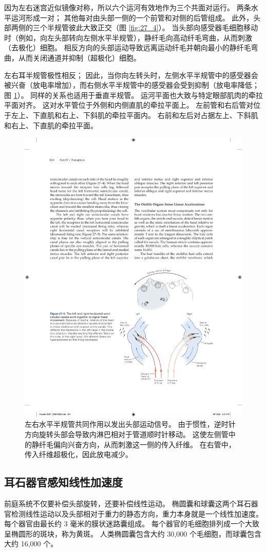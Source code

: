 因为左右迷宫近似镜像对称，所以六个运河有效地作为三个共面对运行。
两条水平运河形成一对； 其他每对由头部一侧的一个前管和对侧的后管组成。
此外，头部两侧的三个半规管彼此大致正交（图 \ref{fig:27_4}）。
当头部向感受器毛细胞移动时（例如，向左头部转向左侧水平半规管），静纤毛向高动纤毛弯曲，从而刺激（去极化）细胞。
相反方向的头部运动导致远离运动纤毛并朝向最小的静纤毛弯曲，从而关闭通道并抑制（超极化）细胞。


左右耳半规管极性相反；
因此，当你向左转头时，左侧水平半规管中的感受器会被兴奋（放电率增加），而右侧水平半规管中的感受器会受到抑制（放电率降低；图 \ref{fig:27_5}）。 
同样的关系也适用于垂直半规管。
运河平面也大致与特定眼部肌肉的牵拉平面对齐。 这对水平管位于外侧和内侧直肌的牵拉平面上。
左前管和右后管对位于左上、下直肌和右上、下斜肌的牵拉平面内。
右前和左后对占据左上、下斜肌和右上、下直肌的牵拉平面。


\begin{figure}[htbp]
	\centering
	\includegraphics[width=0.6\linewidth]{chap27/fig_27_5}
	\caption{左右水平半规管共同作用以发出头部运动信号。 由于惯性，逆时针方向旋转头部会导致内淋巴相对于管道顺时针移动。 这使左侧管中的静纤毛偏向兴奋方向，从而刺激这一侧的传入纤维。 在右管中，传入纤维超极化，因此放电减少。}
	\label{fig:27_5}
\end{figure}



\subsection{耳石器官感知线性加速度}

前庭系统不仅要补偿头部旋转，还要补偿线性运动。
椭圆囊和球囊这两个耳石器官检测线性运动以及头部相对于重力的静态方向，重力本身就是一个线性加速度。
每个器官由最长约 3 毫米的膜状迷路囊组成。
每个器官的毛细胞排列成一个大致呈椭圆形的斑块，称为黄斑。
人类椭圆囊包含大约 30,000 个毛细胞，而球囊包含大约 16,000 个。


